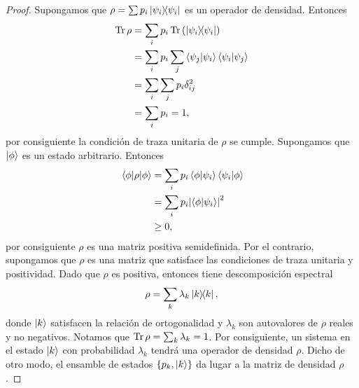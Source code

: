 \begin{proof}
	Supongamos que $\rho = \sum p_i\dyad{\psii}{\psii}$ es un operador de
	densidad. Entonces 
	\begin{align*}
		\Tr \rho &= \sum _i p_i\Tr \qty(\dyad{\psii}{\psii})\\
		&= \sum _i p_i \sum _j \braket{\psi_j}{\psii}\braket{\psii}{\psi_j}\\
		&=\sum _i \sum _j p_i \delta _{ij}^2\\
		&=\sum _i p_i=1,
	\end{align*}
	por consiguiente la condición de traza unitaria de $\rho$ se cumple. 
	Supongamos que $\ket{\phi}$ es un estado arbitrario. Entonces
	\begin{align*}
		\matrixel{\phi}{\rho}{\phi} &= \sum _i p_i \braket{\phi}{\psii}
		\braket{\psii}{\phi} \\
		&=\sum _i p_i \abs{\braket{\phi}{\psii}}^2\\
		&\geq 0,
	\end{align*}
	por consiguiente $\rho$ es una matriz positiva semidefinida. Por el 
	contrario, supongamos que $\rho$ es una matriz que satisface las condiciones
	de traza unitaria y positividad. Dado que $\rho$ es positiva, entonces
	tiene descomposición espectral 
	\begin{align*}
		\rho = \sum _k \lambda _k \dyad{k}{k},
	\end{align*}
	donde $\ket{k}$ satisfacen la relación de ortogonalidad y $\lambda _k$ son
	autovalores de $\rho$ reales y no negativos. Notamos que $\Tr \rho = \sum _k
	\lambda _k = 1$. Por consiguiente, un sistema en el estado $\ket{k}$ con 
	probabilidad $\lambda_k$ tendrá una operador de densidad $\rho$. Dicho 
	de otro modo, el ensamble de estados $\{ p_k,\ket{k}\}$ da lugar a la matriz
	de densidad $\rho$.
\end{proof}

